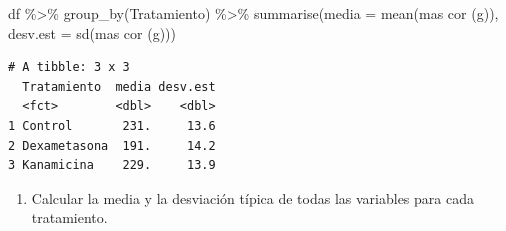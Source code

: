 \documentclass[
  a4paper,
]{scrreport}
\newenvironment{Shaded}{\begin{snugshade}}{\end{snugshade}}
\newcommand{\AttributeTok}[1]{\textcolor[rgb]{0.40,0.45,0.13}{#1}}
\newcommand{\FunctionTok}[1]{\textcolor[rgb]{0.28,0.35,0.67}{#1}}
\newcommand{\NormalTok}[1]{\textcolor[rgb]{0.00,0.23,0.31}{#1}}
\newcommand{\SpecialCharTok}[1]{\textcolor[rgb]{0.37,0.37,0.37}{#1}}
\newcommand{\StringTok}[1]{\textcolor[rgb]{0.13,0.47,0.30}{#1}}
\providecommand{\tightlist}{%
  \setlength{\itemsep}{0pt}\setlength{\parskip}{0pt}}\usepackage{longtable,booktabs,array}
\theoremstyle{definition}
\theoremstyle{definition}
\theoremstyle{remark}
\begin{document}
\begin{tcolorbox}[enhanced jigsaw, rightrule=.15mm, titlerule=0mm, colbacktitle=quarto-callout-note-color!10!white, toprule=.15mm, coltitle=black, bottomtitle=1mm, opacityback=0, toptitle=1mm, title=\textcolor{quarto-callout-note-color}{\faInfo}\hspace{0.5em}{Solución}, left=2mm, colback=white, breakable, colframe=quarto-callout-note-color-frame, leftrule=.75mm, opacitybacktitle=0.6, arc=.35mm, bottomrule=.15mm]

\begin{Shaded}
\begin{Highlighting}[]
\NormalTok{df }\SpecialCharTok{\%\textgreater{}\%}
    \FunctionTok{group\_by}\NormalTok{(Tratamiento) }\SpecialCharTok{\%\textgreater{}\%}
    \FunctionTok{summarise}\NormalTok{(}\AttributeTok{media =} \FunctionTok{mean}\NormalTok{(}\StringTok{\textasciigrave{}}\AttributeTok{mas cor (g)}\StringTok{\textasciigrave{}}\NormalTok{), }\AttributeTok{desv.est =} \FunctionTok{sd}\NormalTok{(}\StringTok{\textasciigrave{}}\AttributeTok{mas cor (g)}\StringTok{\textasciigrave{}}\NormalTok{))}
\end{Highlighting}
\end{Shaded}

\begin{verbatim}
# A tibble: 3 x 3
  Tratamiento  media desv.est
  <fct>        <dbl>    <dbl>
1 Control       231.     13.6
2 Dexametasona  191.     14.2
3 Kanamicina    229.     13.9
\end{verbatim}

\end{tcolorbox}

\begin{enumerate}
\def\labelenumi{\alph{enumi}.}
\setcounter{enumi}{5}
\tightlist
\item
  Calcular la media y la desviación típica de todas las variables para
  cada tratamiento.
\end{enumerate}
\end{document}
